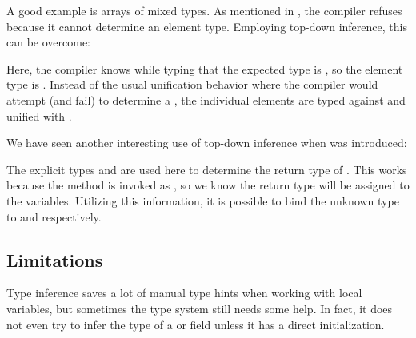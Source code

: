 A good example is arrays of mixed types. As mentioned in , the compiler refuses \expr{[1, "foo"]} because it cannot determine an element type. Employing top-down inference, this can be overcome:


Here, the compiler knows while typing \expr{[1, "foo"]} that the expected type is , so the element type is . Instead of the usual unification behavior where the compiler would attempt (and fail) to determine a , the individual elements are typed against and unified with .

We have seen another interesting use of top-down inference when  was introduced:


The explicit types  and  are used here to determine the return type of . This works because the method is invoked as , so we know the return type will be assigned to the variables. Utilizing this information, it is possible to bind the unknown type  to  and  respectively.





\subsection{Limitations}
\label{type-system-inference-limitations}

Type inference saves a lot of manual type hints when working with local variables, but sometimes the type system still needs some help. In fact, it does not even try to infer the type of a  or  field unless it has a direct initialization.


